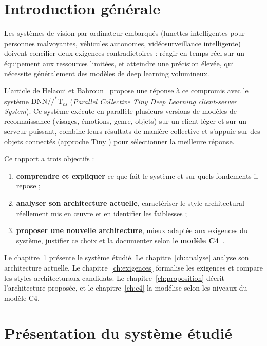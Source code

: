 \documentclass[11pt,a4paper]{report}
\newcommand{\dnnTcs}{\ensuremath{\mathrm{DNN}/\!/^{*}\mathrm{T}_{cs}}}
\begin{document}
\chapter*{Introduction générale}

Les systèmes de vision par ordinateur embarqués (lunettes intelligentes pour personnes malvoyantes, véhicules autonomes, vidéosurveillance intelligente) doivent concilier deux exigences contradictoires : réagir en temps réel sur un équipement aux ressources limitées, et atteindre une précision élevée, qui nécessite généralement des modèles de deep learning volumineux.

L'article de Helaoui et Bahroun~\cite{helaoui2025} propose une réponse à ce compromis avec le système \dnnTcs{} (\emph{Parallel Collective Tiny Deep Learning client-server System}). Ce système exécute en parallèle plusieurs versions de modèles de reconnaissance (visages, émotions, genre, objets) sur un client léger et sur un serveur puissant, combine leurs résultats de manière \og collective \fg{} et s'appuie sur des objets connectés (approche \og Tiny \fg) pour sélectionner la meilleure réponse.

Ce rapport a trois objectifs :
\begin{enumerate}
  \item \textbf{comprendre et expliquer} ce que fait le système et sur quels fondements il repose ;
  \item \textbf{analyser son architecture actuelle}, caractériser le style architectural réellement mis en œuvre et en identifier les faiblesses ;
  \item \textbf{proposer une nouvelle architecture}, mieux adaptée aux exigences du système, justifier ce choix et la documenter selon le \textbf{modèle C4}~\cite{brownC4}.
\end{enumerate}

Le chapitre~\ref{ch:systeme} présente le système étudié. Le chapitre~\ref{ch:analyse} analyse son architecture actuelle. Le chapitre~\ref{ch:exigences} formalise les exigences et compare les styles architecturaux candidats. Le chapitre~\ref{ch:proposition} décrit l'architecture proposée, et le chapitre~\ref{ch:c4} la modélise selon les niveaux du modèle C4.

\chapter{Présentation du système étudié}\label{ch:systeme}
\end{document}
